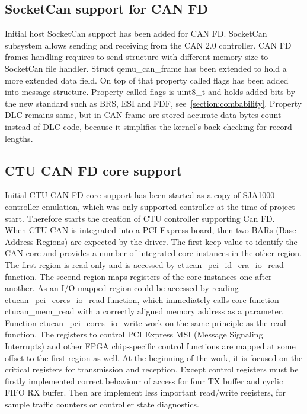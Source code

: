 \documentclass{ctuthesis}
\begin{document}
 \subsection{SocketCan support for CAN FD}
  Initial host SocketCan support has been added for CAN FD. SocketCan subsystem allows sending and receiving from the CAN 2.0 controller. CAN FD frames handling requires to send structure with different memory size to SocketCan file handler. Struct qemu\_can\_frame has been extended to hold a more extended data field. On top of that property called flags has been added into message structure. Property called flags is uint8\_t and holds added bits by the new standard such as BRS, ESI and FDF, see~\ref{section:combability}. Property DLC remains same, but in CAN frame are stored accurate data bytes count instead of DLC code, because it simplifies the kernel's back-checking for record lengths.

 \subsection{CTU CAN FD core support}
  Initial CTU CAN FD core support has been started as a copy of SJA1000 controller emulation, which was only supported controller at the time of project start. Therefore starts the creation of CTU controller supporting Can FD. \\
  When CTU CAN is integrated into a PCI Express board, then two BARs (Base Address Regions) are expected by the driver. The first keep value to identify the CAN core and provides a number of integrated core instances in the other region. The first region is read-only and is accessed by ctucan\_pci\_id\_cra\_io\_read function. The second region maps registers of the core instances one after another. As an I/O mapped region could be accessed by reading ctucan\_pci\_cores\_io\_read function, which immediately calls core function ctucan\_mem\_read with a correctly aligned memory address as a parameter. Function ctucan\_pci\_cores\_io\_write work on the same principle as the read function. The registers to control PCI Express MSI (Message Signaling Interrupts) and other FPGA chip-specific control functions are mapped at some offset to the first region as well. At the beginning of the work, it is focused on the critical registers for transmission and reception. Except control registers must be firstly implemented correct behaviour of access for four TX buffer and cyclic FIFO RX buffer. Then are implement less important read/write registers, for sample traffic counters or controller state diagnostics.
 
\end{document}
